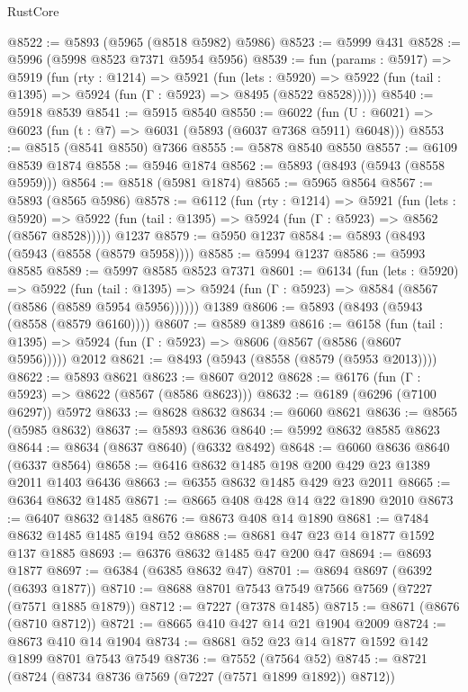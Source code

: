\begin{lexlean}{RustCore}
\begin{coremodule}
@8522 := @5893 (@5965 (@8518 @5982) @5986)
@8523 := @5999 @431
@8528 := @5996 (@5998 @8523 @7371 @5954 @5956)
@8539 := fun (params : @5917) =>
  @5919
    (fun (rty : @1214) =>
    @5921
      (fun (lets : @5920) =>
      @5922 (fun (tail : @1395) => @5924 (fun (Γ : @5923) => @8495 (@8522 @8528)))))
@8540 := @5918 @8539
@8541 := @5915 @8540
@8550 := @6022 (fun (U : @6021) => @6023 (fun (t : @7) => @6031 (@5893 (@6037 @7368 @5911) @6048)))
@8553 := @8515 (@8541 @8550) @7366
@8555 := @5878 @8540 @8550
@8557 := @6109 @8539 @1874
@8558 := @5946 @1874
@8562 := @5893 (@8493 (@5943 (@8558 @5959)))
@8564 := @8518 (@5981 @1874)
@8565 := @5965 @8564
@8567 := @5893 (@8565 @5986)
@8578 := @6112
    (fun (rty : @1214) =>
    @5921
      (fun (lets : @5920) =>
      @5922 (fun (tail : @1395) => @5924 (fun (Γ : @5923) => @8562 (@8567 @8528)))))
    @1237
@8579 := @5950 @1237
@8584 := @5893 (@8493 (@5943 (@8558 (@8579 @5958))))
@8585 := @5994 @1237
@8586 := @5993 @8585
@8589 := @5997 @8585 @8523 @7371
@8601 := @6134
    (fun (lets : @5920) =>
    @5922
      (fun (tail : @1395) => @5924 (fun (Γ : @5923) => @8584 (@8567 (@8586 (@8589 @5954 @5956))))))
    @1389
@8606 := @5893 (@8493 (@5943 (@8558 (@8579 @6160))))
@8607 := @8589 @1389
@8616 := @6158
    (fun (tail : @1395) => @5924 (fun (Γ : @5923) => @8606 (@8567 (@8586 (@8607 @5956)))))
    @2012
@8621 := @8493 (@5943 (@8558 (@8579 (@5953 @2013))))
@8622 := @5893 @8621
@8623 := @8607 @2012
@8628 := @6176 (fun (Γ : @5923) => @8622 (@8567 (@8586 @8623)))
@8632 := @6189 (@6296 (@7100 @6297)) @5972
@8633 := @8628 @8632
@8634 := @6060 @8621
@8636 := @8565 (@5985 @8632)
@8637 := @5893 @8636
@8640 := @5992 @8632 @8585 @8623
@8644 := @8634 (@8637 @8640) (@6332 @8492)
@8648 := @6060 @8636 @8640 (@6337 @8564)
@8658 := @6416 @8632 @1485 @198 @200 @429 @23 @1389 @2011 @1403 @6436
@8663 := @6355 @8632 @1485 @429 @23 @2011
@8665 := @6364 @8632 @1485
@8671 := @8665 @408 @428 @14 @22 @1890 @2010
@8673 := @6407 @8632 @1485
@8676 := @8673 @408 @14 @1890
@8681 := @7484 @8632 @1485 @1485 @194 @52
@8688 := @8681 @47 @23 @14 @1877 @1592 @137 @1885
@8693 := @6376 @8632 @1485 @47 @200 @47
@8694 := @8693 @1877
@8697 := @6384 (@6385 @8632 @47)
@8701 := @8694 @8697 (@6392 (@6393 @1877))
@8710 := @8688 @8701 @7543 @7549 @7566 @7569 (@7227 (@7571 @1885 @1879))
@8712 := @7227 (@7378 @1485)
@8715 := @8671 (@8676 (@8710 @8712))
@8721 := @8665 @410 @427 @14 @21 @1904 @2009
@8724 := @8673 @410 @14 @1904
@8734 := @8681 @52 @23 @14 @1877 @1592 @142 @1899 @8701 @7543 @7549
@8736 := @7552 (@7564 @52)
@8745 := @8721 (@8724 (@8734 @8736 @7569 (@7227 (@7571 @1899 @1892)) @8712))

\end{coremodule}
\end{lexlean}
